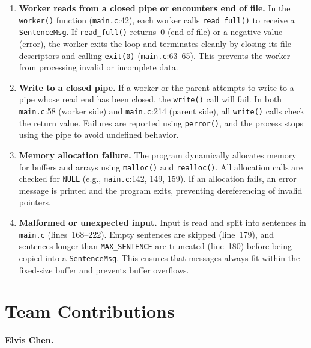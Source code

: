 \documentclass[12pt]{article}
\begin{document}
\begin{enumerate}[label=(\roman*)]

  \item \textbf{Worker reads from a closed pipe or encounters end of
  file.}
  In the \texttt{worker()} function (\texttt{main.c}:42), each worker
  calls \texttt{read\_full()} to receive a \texttt{SentenceMsg}. If
  \texttt{read\_full()} returns~0 (end of file) or a negative value
  (error), the worker exits the loop and terminates cleanly by closing
  its file descriptors and calling \texttt{exit(0)}
  (\texttt{main.c}:63--65). This prevents the worker from processing
  invalid or incomplete data.

  \item \textbf{Write to a closed pipe.}
  If a worker or the parent attempts to write to a pipe whose read end
  has been closed, the \texttt{write()} call will fail. In both
  \texttt{main.c}:58 (worker side) and \texttt{main.c}:214 (parent
  side), all \texttt{write()} calls check the return value. Failures are
  reported using \texttt{perror()}, and the process stops using the pipe
  to avoid undefined behavior.

  \item \textbf{Memory allocation failure.}
  The program dynamically allocates memory for buffers and arrays using
  \texttt{malloc()} and \texttt{realloc()}. All allocation calls are
  checked for \texttt{NULL} (e.g., \texttt{main.c}:142, 149, 159). If
  an allocation fails, an error message is printed and the program exits,
  preventing dereferencing of invalid pointers.

  \item \textbf{Malformed or unexpected input.}
  Input is read and split into sentences in \texttt{main.c}
  (lines~168--222). Empty sentences are skipped (line~179), and sentences
  longer than \texttt{MAX\_SENTENCE} are truncated (line~180) before
  being copied into a \texttt{SentenceMsg}. This ensures that messages
  always fit within the fixed-size buffer and prevents buffer overflows.

\end{enumerate}

\section{Team Contributions}

\textbf{Elvis Chen.}
\end{document}
